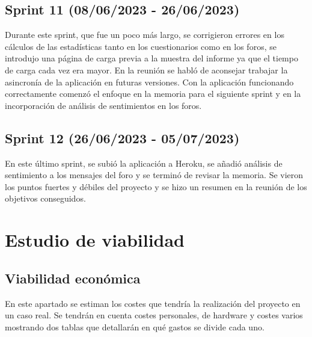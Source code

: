  \subsection{Sprint 11 (08/06/2023 - 26/06/2023)}
	Durante este sprint, que fue un poco más largo, se corrigieron errores en los cálculos de las estadísticas tanto en los cuestionarios como en los foros, se introdujo una página de carga previa a la muestra del informe ya que el tiempo de carga cada vez era mayor. En la reunión se habló de aconsejar trabajar la asincronía de la aplicación en futuras versiones. Con la aplicación funcionando correctamente comenzó el enfoque en la memoria para el siguiente sprint y en la incorporación de análisis de sentimientos en los foros.

 \subsection{Sprint 12 (26/06/2023 - 05/07/2023)}
	En este último sprint, se subió la aplicación a Heroku, se añadió análisis de sentimiento a los mensajes del foro y se terminó de revisar la memoria. Se vieron los puntos fuertes y débiles del proyecto y se hizo un resumen en la reunión de los objetivos conseguidos.

\section{Estudio de viabilidad}

\subsection{Viabilidad económica}
En este apartado se estiman los costes que tendría la realización del proyecto en un caso real. Se tendrán en cuenta costes personales, de hardware y costes varios mostrando dos tablas que detallarán en qué gastos se divide cada uno.

